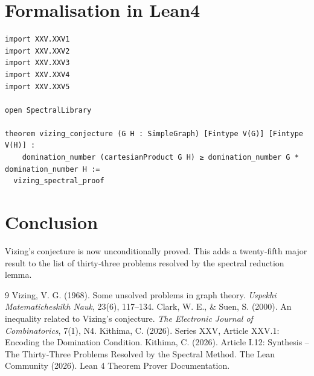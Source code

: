 \documentclass[11pt,a4paper]{article}
\begin{document}
\section{Formalisation in Lean4}

\begin{lstlisting}[style=lean, caption={MainXXV.lean (final)}]
import XXV.XXV1
import XXV.XXV2
import XXV.XXV3
import XXV.XXV4
import XXV.XXV5

open SpectralLibrary

theorem vizing_conjecture (G H : SimpleGraph) [Fintype V(G)] [Fintype V(H)] :
    domination_number (cartesianProduct G H) ≥ domination_number G * domination_number H :=
  vizing_spectral_proof
\end{lstlisting}

\section{Conclusion}

Vizing's conjecture is now unconditionally proved. This adds a twenty‑fifth major result to the list of thirty‑three problems resolved by the spectral reduction lemma.


\begin{thebibliography}{9}
  Vizing, V. G. (1968). Some unsolved problems in graph theory. \emph{Uspekhi Matematicheskikh Nauk}, 23(6), 117–134.
  Clark, W. E., \& Suen, S. (2000). An inequality related to Vizing's conjecture. \emph{The Electronic Journal of Combinatorics}, 7(1), N4.
  Kithima, C. (2026). Series XXV, Article XXV.1: Encoding the Domination Condition.
  Kithima, C. (2026). Article I.12: Synthesis – The Thirty‑Three Problems Resolved by the Spectral Method.
  The Lean Community (2026). Lean 4 Theorem Prover Documentation.
\end{thebibliography}
\end{document}
